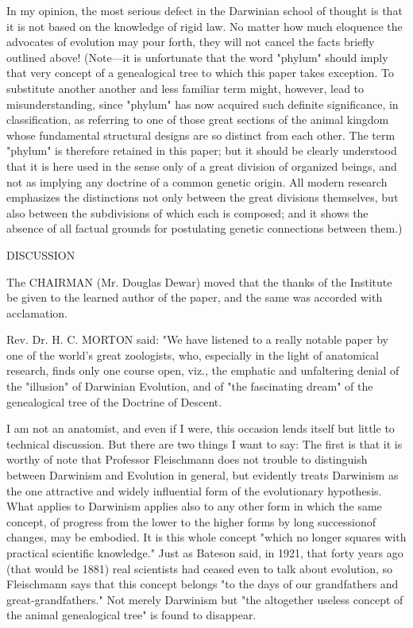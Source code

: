 In my opinion, the most serious defect in the Darwinian school of thought is that it is not
based on the knowledge of rigid law. No matter how much eloquence the advocates of
evolution may pour forth, they will not cancel the facts briefly outlined above!
(Note—it is unfortunate that the word "phylum" should imply that very concept of a
genealogical tree to which this paper takes exception. To substitute another another and less
familiar term might, however, lead to misunderstanding, since "phylum" has now acquired
such definite significance, in classification, as referring to one of those great sections of the
animal kingdom whose fundamental structural designs are so distinct from each other. The
term "phylum" is therefore retained in this paper; but it should be clearly understood that it is
here used in the sense only of a great division of organized beings, and not as implying any
doctrine of a common genetic origin. All modern research emphasizes the distinctions not
only between the great divisions themselves, but also between the subdivisions of which each
is composed; and it shows the absence of all factual grounds for postulating genetic
connections between them.)

DISCUSSION

The CHAIRMAN (Mr. Douglas Dewar) moved that the thanks of the Institute be given to the
learned author of the paper, and the same was accorded with acclamation.

Rev. Dr. H. C. MORTON said: "We have listened to a really notable paper by one of the
world's great zoologists, who, especially in the light of anatomical research, finds only one
course open, viz., the emphatic and unfaltering denial of the "illusion" of Darwinian
Evolution, and of "the fascinating dream" of the genealogical tree of the Doctrine of Descent.

I am not an anatomist, and even if I were, this occasion lends itself but little to technical
discussion. But there are two things I want to say: The first is that it is worthy of note that
Professor Fleischmann does not trouble to distinguish between Darwinism and Evolution in
general, but evidently treats Darwinism as the one attractive and widely influential form of
the evolutionary hypothesis. What applies to Darwinism applies also to any other form in
which the same concept, of progress from the lower to the higher forms by long successionof changes, may be embodied. It is this whole concept "which no longer squares with
practical scientific knowledge." Just as Bateson said, in 1921, that forty years ago (that would
be 1881) real scientists had ceased even to talk about evolution, so Fleischmann says that this
concept belongs "to the days of our grandfathers and great-grandfathers." Not merely
Darwinism but "the altogether useless concept of the animal genealogical tree" is found to
disappear.

